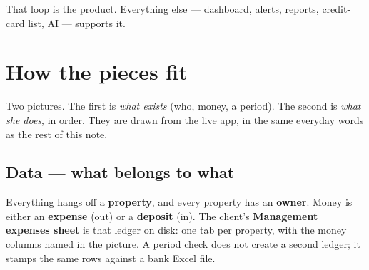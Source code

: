 \documentclass[11pt,a4paper]{article}
\begin{document}
That loop is the product.
Everything else --- dashboard, alerts, reports, credit-card list, AI ---
supports it.

\section{How the pieces fit}
\label{sec:pictures}

Two pictures. The first is \emph{what exists} (who, money, a period).
The second is \emph{what she does}, in order.
They are drawn from the live app, in the same everyday words as the rest
of this note.

\subsection{Data --- what belongs to what}
\label{sec:data-picture}

Everything hangs off a \textbf{property}, and every property has an
\textbf{owner}.
Money is either an \textbf{expense} (out) or a \textbf{deposit} (in).
The client's \textbf{Management expenses sheet} is that ledger on disk:
one tab per property, with the money columns named in the picture.
A period check does not create a second ledger; it stamps the same rows
against a bank Excel file.
\end{document}
